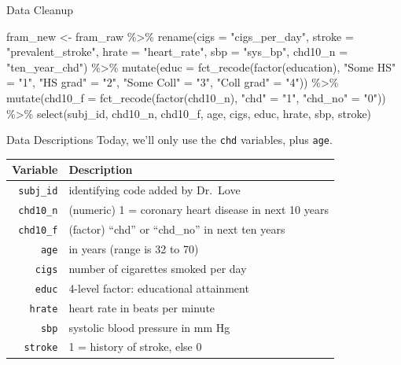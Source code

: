 \documentclass[
  ignorenonframetext,
]{beamer}
\newenvironment{Shaded}{\begin{snugshade}}{\end{snugshade}}
\newcommand{\AttributeTok}[1]{\textcolor[rgb]{0.77,0.63,0.00}{#1}}
\newcommand{\FunctionTok}[1]{\textcolor[rgb]{0.00,0.00,0.00}{#1}}
\newcommand{\NormalTok}[1]{#1}
\newcommand{\OtherTok}[1]{\textcolor[rgb]{0.56,0.35,0.01}{#1}}
\newcommand{\SpecialCharTok}[1]{\textcolor[rgb]{0.00,0.00,0.00}{#1}}
\newcommand{\StringTok}[1]{\textcolor[rgb]{0.31,0.60,0.02}{#1}}
\begin{document}
\begin{frame}[fragile]{Data Cleanup}
\protect\hypertarget{data-cleanup}{}
\begin{Shaded}
\begin{Highlighting}[]
\NormalTok{fram\_new }\OtherTok{\textless{}{-}}\NormalTok{ fram\_raw }\SpecialCharTok{\%\textgreater{}\%}
    \FunctionTok{rename}\NormalTok{(}\AttributeTok{cigs =} \StringTok{"cigs\_per\_day"}\NormalTok{,}
           \AttributeTok{stroke =} \StringTok{"prevalent\_stroke"}\NormalTok{,}
           \AttributeTok{hrate =} \StringTok{"heart\_rate"}\NormalTok{,}
           \AttributeTok{sbp =} \StringTok{"sys\_bp"}\NormalTok{,}
           \AttributeTok{chd10\_n =} \StringTok{"ten\_year\_chd"}\NormalTok{) }\SpecialCharTok{\%\textgreater{}\%}
    \FunctionTok{mutate}\NormalTok{(}\AttributeTok{educ =} \FunctionTok{fct\_recode}\NormalTok{(}\FunctionTok{factor}\NormalTok{(education), }
                     \StringTok{"Some HS"} \OtherTok{=} \StringTok{"1"}\NormalTok{,}
                     \StringTok{"HS grad"} \OtherTok{=} \StringTok{"2"}\NormalTok{,}
                     \StringTok{"Some Coll"} \OtherTok{=} \StringTok{"3"}\NormalTok{,}
                     \StringTok{"Coll grad"} \OtherTok{=} \StringTok{"4"}\NormalTok{)) }\SpecialCharTok{\%\textgreater{}\%}
    \FunctionTok{mutate}\NormalTok{(}\AttributeTok{chd10\_f =} \FunctionTok{fct\_recode}\NormalTok{(}\FunctionTok{factor}\NormalTok{(chd10\_n),}
                     \StringTok{"chd"} \OtherTok{=} \StringTok{"1"}\NormalTok{, }\StringTok{"chd\_no"} \OtherTok{=} \StringTok{"0"}\NormalTok{)) }\SpecialCharTok{\%\textgreater{}\%}
    \FunctionTok{select}\NormalTok{(subj\_id, chd10\_n, chd10\_f, age, }
\NormalTok{           cigs, educ, hrate, sbp, stroke)}
\end{Highlighting}
\end{Shaded}
\end{frame}

\begin{frame}[fragile]{Data Descriptions}
\protect\hypertarget{data-descriptions}{}
Today, we'll only use the \texttt{chd} variables, plus \texttt{age}.

\begin{longtable}[]{@{}rl@{}}
\toprule
Variable & Description \\
\midrule
\endhead
\texttt{subj\_id} & identifying code added by Dr.~Love \\
\texttt{chd10\_n} & (numeric) 1 = coronary heart disease in next 10
years \\
\texttt{chd10\_f} & (factor) ``chd'' or ``chd\_no'' in next ten years \\
\texttt{age} & in years (range is 32 to 70) \\
\texttt{cigs} & number of cigarettes smoked per day \\
\texttt{educ} & 4-level factor: educational attainment \\
\texttt{hrate} & heart rate in beats per minute \\
\texttt{sbp} & systolic blood pressure in mm Hg \\
\texttt{stroke} & 1 = history of stroke, else 0 \\
\bottomrule
\end{longtable}
\end{frame}
\end{document}
